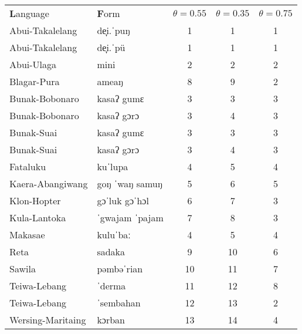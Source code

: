  \begin{tabular}{llccc}
    \textbf Language & \textbf Form & $\theta=0.55$ & $\theta=0.35$ & $\theta=0.75$\\
    Abui-Takalelang & de̞i.ˈpuŋ& 1 & 1 & 1 \\
    Abui-Takalelang & de̞i.ˈpü & 1 & 1 & 1 \\
    Abui-Ulaga & mini & 2 & 2 & 2 \\
    Blagar-Pura & ameaŋ & 8 & 9 & 2 \\
    Bunak-Bobonaro & kasaʔ gumɛ & 3 & 3 & 3 \\
    Bunak-Bobonaro & kasaʔ gɔrɔ & 3 & 4 & 3 \\
    Bunak-Suai & kasaʔ gumɛ & 3 & 3 & 3 \\
    Bunak-Suai & kasaʔ gɔrɔ & 3 & 4 & 3 \\
    Fataluku & kuˈlupa & 4 & 5 & 4 \\
    Kaera-Abangiwang & goŋ ˈwaŋ samuŋ & 5 & 6 & 5 \\
    Klon-Hopter & gɔˈluk gɔˈhɔl & 6 & 7 & 3 \\
    Kula-Lantoka & ˈgwajam ˈpajam & 7 & 8 & 3 \\
    Makasae & kuluˈbaː & 4 & 5 & 4 \\
    Reta & sadaka & 9 & 10 & 6 \\
    Sawila & pəmbəˈrian & 10 & 11 & 7 \\
    Teiwa-Lebang & ˈderma & 11 & 12 & 8 \\
    Teiwa-Lebang & ˈsembahan & 12 & 13 & 2 \\
    Wersing-Maritaing & kɔrban & 13 & 14 & 4
  \end{tabular}
